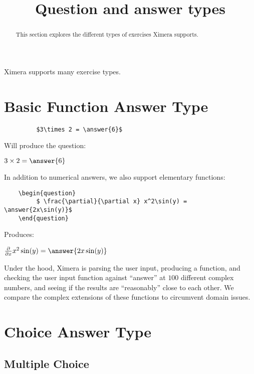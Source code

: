 \documentclass{ximera}
\title{Question and answer types}
\begin{document}
\begin{abstract}
  This section explores the different types of exercises Ximera supports. 
\end{abstract}

\maketitle

Ximera supports many exercise types.


\section{Basic Function Answer Type}	
\begin{verbatim}
         $3\times 2 = \answer{6}$
\end{verbatim}

Will produce the question:

\begin{question}
  $3\times 2 = \answer{6}$
\end{question}

In addition to numerical answers, we also support elementary functions:

\begin{verbatim}
    \begin{question}
         $ \frac{\partial}{\partial x} x^2\sin(y) =  \answer{2x\sin(y)}$
    \end{question}
\end{verbatim}

Produces:

\begin{question}
  $ \frac{\partial}{\partial x} x^2\sin(y) = \answer{2x\sin(y)}$
\end{question}

\begin{remark}
Under the hood, Ximera is parsing the user input, producing a
function, and checking the user input function against ``answer'' at
$100$ different complex numbers, and seeing if the results are
``reasonably'' close to each other.  We compare the complex extensions
of these functions to circumvent domain issues.
\end{remark}

\section{Choice Answer Type}

\subsection{Multiple Choice}
\end{document}
